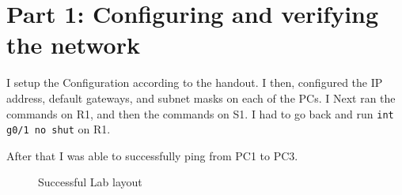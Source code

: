 \documentclass{report}
\title{\classinfo}
\author{\semester}
\date{\today}
\newcommand{\mysection}[1]{\section*{#1}}
\begin{document}
\maketitle

\mysection{\textbf{Part 1: Configuring and verifying the network}}

I setup the Configuration according to the handout. I then, configured the IP
address, default gateways, and subnet masks on each of the PCs.
I Next ran the commands on R1, and then the commands on S1. I had to go back
and run {\scriptsize{\verb$int g0/1 no shut$}\normalsize} on R1.

After that I was able to successfully ping from PC1 to PC3.


\begin{figure}[!hbt]\centering
{}\par
{}\par
\caption{Successful Lab layout}
\label{success14}
\end{figure}








\end{document}
